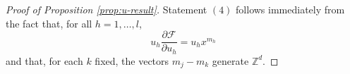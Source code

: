 \documentclass[10pt,a4paper]{amsart}
\newcommand{\ZZ}{\mathbb{Z}}
\begin{document}
\begin{proof}[Proof of Proposition \ref{prop:u-result}]
Statement $(4)$ follows immediately from the fact that, for all $h=1, \dots, l$,
\[u_h \frac{\partial \mathcal{F}} {\partial u_h}= u_h x^{m_h}\]
and that, for each $k$ fixed, the vectors $m_j-m_k$ generate $\ZZ^d$.

\end{proof}
\end{document}
